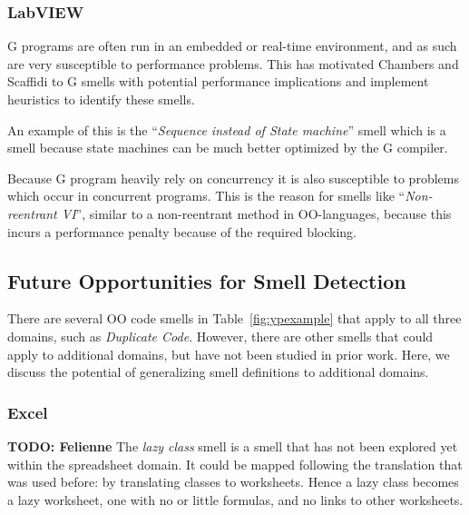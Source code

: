 \documentclass[10pt,conference,compsocconf]{IEEEtran}
\newcommand{\todo}[1]{\textbf{TODO: #1}}
\begin{document}
\subsubsection{LabVIEW}

G programs are often run in an embedded or real-time environment, and as such are very susceptible to performance problems. This has motivated Chambers and Scaffidi \cite{chambers2013smell} to G smells with potential performance implications and implement heuristics to identify these smells.

An example of this is the ``\textit{Sequence instead of State machine}'' smell which is a smell because state machines can be much better optimized by the G compiler.

Because G program heavily rely on concurrency it is also susceptible to problems which occur in concurrent programs.
This is the reason for smells like ``\textit{Non-reentrant VI}'', similar to a non-reentrant method in OO-languages, because this incurs a performance penalty because of the required blocking.

\subsection{Future Opportunities for Smell Detection}
\label{subsec:futuresmells}
There are several OO code smells in Table~\ref{fig:ypexample} that apply to all three domains, such as \emph{Duplicate Code}. However, there are other smells that could apply to additional domains, but have not been studied in prior work. Here, we discuss the potential of generalizing smell definitions to additional domains. 

\subsubsection{Excel} \todo{Felienne}
The \emph{lazy class} smell is a smell that has not been explored yet within the spreadsheet domain. It could be mapped following the translation that was used before: by translating classes to worksheets. Hence a lazy class becomes a lazy worksheet, one with no or little formulas, and no links to other worksheets.

\end{document}
